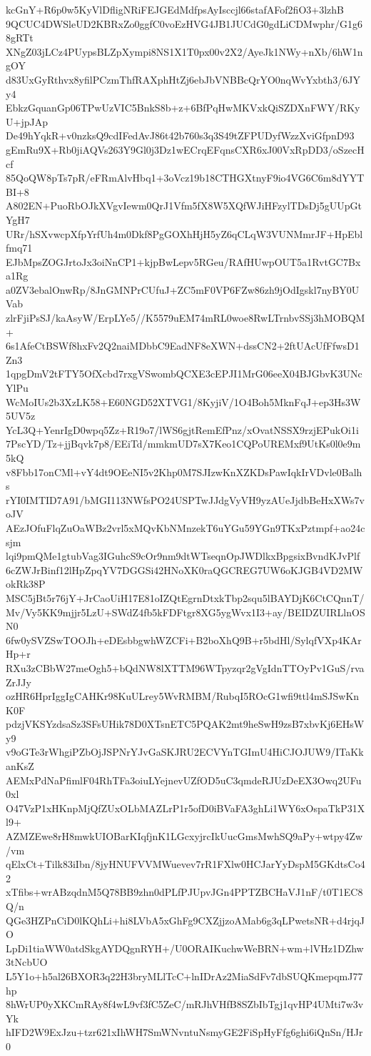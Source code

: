 kcGnY+R6p0w5KyVlDfligNRiFEJGEdMdfpsAyIsccjl66stafAFof2fiO3+3lzhB
9QCUC4DWSleUD2KBRxZo0ggfC0voEzHVG4JB1JUCdG0gdLiCDMwphr/G1g68gRTt
XNgZ03jLCz4PUypsBLZpXympi8NS1X1T0px00v2X2/AyeJk1NWy+nXb/6hW1ngOY
d83UxGyRthvx8yfilPCzmThfRAXphHtZj6ebJbVNBBcQrYO0nqWvYxbth3/6JYy4
EbkzGquanGp06TPwUzVIC5BnkS8b+z+6BfPqHwMKVxkQiSZDXnFWY/RKyU+jpJAp
De49hYqkR+v0nzksQ9cdIFedAvJ86t42b760s3q3S49tZFPUDyfWzzXviGfpnD93
gEmRu9X+Rb0jiAQVs263Y9Gl0j3Dz1wECrqEFqnsCXR6xJ00VxRpDD3/oSzecHcf
85QoQW8pTs7pR/eFRmAlvHbq1+3oVcz19b18CTHGXtnyF9io4VG6C6m8dYYTBI+8
A802EN+PuoRbOJkXVgvIewm0QrJ1Vfm5fX8W5XQfWJiHFzylTDsDj5gUUpGtYgH7
URr/hSXvwcpXfpYrfUh4m0Dkf8PgGOXhHjH5yZ6qCLqW3VUNMmrJF+HpEblfmq71
EJbMpsZOGJrtoJx3oiNnCP1+kjpBwLepv5RGeu/RAfHUwpOUT5a1RvtGC7Bxa1Rg
a0ZV3ebalOnwRp/8JnGMNPrCUfuJ+ZC5mF0VP6FZw86zh9jOdIgskl7nyBY0UVab
zlrFjiPsSJ/kaAsyW/ErpLYe5//K5579uEM74mRL0woe8RwLTrnbvSSj3hMOBQM+
6s1AfeCtBSWf8hxFv2Q2naiMDbbC9EadNF8eXWN+dssCN2+2ftUAcUfFfwsD1Zn3
1qpgDmV2tFTY5OfXcbd7rxgVSwombQCXE3cEPJI1MrG06eeX04BJGbvK3UNcYlPu
WcMoIUs2b3XzLK58+E60NGD52XTVG1/8KyjiV/1O4Boh5MknFqJ+ep3Hs3W5UV5z
YcL3Q+YenrIgD0wpq5Zz+R19o7/lWS6gjtRemEfPnz/xOvatNSSX9rzjEPukOi1i
7PscYD/Tz+jjBqvk7p8/EEiTd/mmkmUD7sX7Keo1CQPoUREMxf9UtKs0l0e9m5kQ
v8Fbb17onCMl+vY4dt9OEeNI5v2Khp0M7SJIzwKnXZKDsPawIqkIrVDvle0Balhs
rYI0IMTID7A91/bMGI113NWfsPO24USPTwJJdgVyVH9yzAUeJjdbBeHxXWs7voJV
AEzJOfuFlqZuOaWBz2vrl5xMQvKbNMnzekT6uYGu59YGn9TKxPztmpf+ao24csjm
lqi9pmQMe1gtubVag3IGuhcS9cOr9nm9dtWTseqnOpJWDlkxBpgsixBvndKJvPlf
6cZWJrBinf12lHpZpqYV7DGGSi42HNoXK0raQGCREG7UW6oKJGB4VD2MWokRk38P
MSC5jBt5r76jY+JrCaoUiH17E81oIZQtEgrnDtxkTbp2squ5lBAYDjK6CtCQnnT/
Mv/Vy5KK9mjjr5LzU+SWdZ4fb5kFDFtgr8XG5ygWvx1I3+ay/BEIDZUIRLlnOSN0
6fw0ySVZSwTOOJh+eDEsbbgwhWZCFi+B2boXhQ9B+r5bdHl/SylqfVXp4KArHp+r
RXu3zCBbW27meOgh5+bQdNW8lXTTM96WTpyzqr2gVgIdnTTOyPv1GuS/rvaZrJJy
ozHR6HprIggIgCAHKr98KuULrey5WvRMBM/RubqI5ROcG1wfi9ttl4mSJSwKnK0F
pdzjVKSYzdsaSz3SFsUHik78D0XTsnETC5PQAK2mt9heSwH9zsB7xbvKj6EHsWy9
v9oGTe3rWhgiPZbOjJSPNrYJvGaSKJRU2ECVYnTGImU4HiCJOJUW9/ITaKkanKsZ
AEMxPdNaPfimlF04RhTFa3oiuLYejnevUZfOD5uC3qmdeRJUzDeEX3Owq2UFu0xl
O47VzP1xHKnpMjQfZUxOLbMAZLrP1r5ofD0iBVaFA3ghLi1WY6xOspaTkP31Xl9+
AZMZEwe8rH8mwkUIOBarKIqfjnK1LGcxyjrcIkUucGmsMwhSQ9aPy+wtpy4Zw/vm
qElxCt+Tilk83iIbn/8jyHNUFVVMWuevev7rR1FXlw0HCJarYyDspM5GKdtsCo42
xTfibs+wrABzqdnM5Q78BB9zhn0dPLfPJUpvJGn4PPTZBCHaVJ1nF/t0T1EC8Q/n
QGe3HZPnCiD0lKQhLi+hi8LVbA5xGhFg9CXZjjzoAMab6g3qLPwetsNR+d4rjqJO
LpDi1tiaWW0atdSkgAYDQgnRYH+/U0ORAIKuchwWeBRN+wm+lVHz1DZhw3tNcbUO
L5Y1o+h5al26BXOR3q22H3bryMLlTcC+lnIDrAz2MiaSdFv7dbSUQKmepqmJ77hp
8hWrUP0yXKCmRAy8f4wL9vf3fC5ZeC/mRJhVHfB8SZbIbTgj1qvHP4UMti7w3vYk
hIFD2W9ExJzu+tzr621xIhWH7SmWNvntuNsmyGE2FiSpHyFfg6ghi6iQnSn/HJr0

